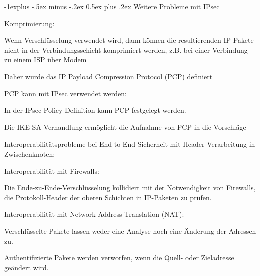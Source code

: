 \documentclass[a4paper]{article}
\makeatletter
\renewcommand{\subsection}{\@startsection{subsection}{2}{0mm}%
 {-1explus -.5ex minus -.2ex}%
 {0.5ex plus .2ex}%
 {\normalfont\normalsize\bfseries}}
\makeatother
\begin{document}
\begin{multicols}{3}
      \subsection{Weitere Probleme mit IPsec}
      \begin{itemize*}
            \item Komprimierung:
            \begin{itemize*}
                  \item Wenn Verschlüsselung verwendet wird, dann können die resultierenden IP-Pakete nicht in der Verbindungsschicht komprimiert werden, z.B. bei einer Verbindung zu einem ISP über Modem
                  \item Daher wurde das IP Payload Compression Protocol (PCP) definiert
                  \item PCP kann mit IPsec verwendet werden:
                  \begin{itemize*}
                        \item In der IPsec-Policy-Definition kann PCP festgelegt werden.
                        \item Die IKE SA-Verhandlung ermöglicht die Aufnahme von PCP in die Vorschläge
                  \end{itemize*}
            \end{itemize*}
            \item Interoperabilitätsprobleme bei End-to-End-Sicherheit mit Header-Verarbeitung in Zwischenknoten:
            \begin{itemize*}
                  \item Interoperabilität mit Firewalls:
                  \begin{itemize*}
                        \item Die Ende-zu-Ende-Verschlüsselung kollidiert mit der Notwendigkeit von Firewalls, die Protokoll-Header der oberen Schichten in IP-Paketen zu prüfen.
                  \end{itemize*}
                  \item Interoperabilität mit Network Address Translation (NAT):
                  \begin{itemize*}
                        \item Verschlüsselte Pakete lassen weder eine Analyse noch eine Änderung der Adressen zu.
                        \item Authentifizierte Pakete werden verworfen, wenn die Quell- oder Zieladresse geändert wird.
                  \end{itemize*}
            \end{itemize*}
      \end{itemize*}


\end{multicols}
\end{document}
